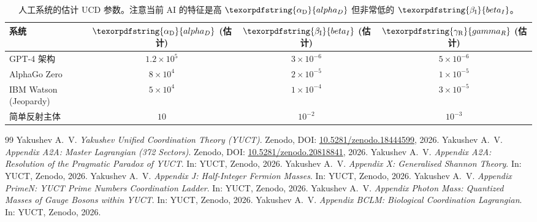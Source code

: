 \documentclass[11pt,a4paper]{article}
\DeclareRobustCommand{\alD}{\texorpdfstring{\ensuremath{\alpha_{\mathrm{D}}}}{alpha_D}}
\DeclareRobustCommand{\beI}{\texorpdfstring{\ensuremath{\beta_{\mathrm{I}}}}{beta_I}}
\DeclareRobustCommand{\gaR}{\texorpdfstring{\ensuremath{\gamma_{\mathrm{R}}}}{gamma_R}}
\begin{document}
	\begin{table}[ht]
		\centering
		\begin{tabular}{lccc}
			\toprule
			\textbf{系统} & \(\alD\) (估计) & \(\beI\) (估计) & \(\gaR\) (估计) \\
			\midrule
			GPT-4 架构 & \(1.2 \times 10^5\) & \(3 \times 10^{-6}\) & \(5 \times 10^{-6}\) \\
			AlphaGo Zero & \(8 \times 10^4\) & \(2 \times 10^{-5}\) & \(1 \times 10^{-5}\) \\
			IBM Watson (Jeopardy) & \(5 \times 10^4\) & \(1 \times 10^{-4}\) & \(3 \times 10^{-5}\) \\
			简单反射主体 & \(10\) & \(10^{-2}\) & \(10^{-3}\) \\
			\bottomrule
		\end{tabular}
		\caption{人工系统的估计 UCD 参数。注意当前 AI 的特征是高 \(\alD\) 但非常低的 \(\beI\)。}
		\label{tab:ai-measurements}
	\end{table}
	
	\begin{thebibliography}{99}
		Yakushev A.~V. \emph{Yakushev Unified Coordination Theory (YUCT)}. Zenodo, DOI: \href{https://doi.org/10.5281/zenodo.18444599}{10.5281/zenodo.18444599}, 2026.
		Yakushev A.~V. \emph{Appendix A2A: Master Lagrangian (372 Sectors)}. Zenodo, DOI: \href{https://doi.org/10.5281/zenodo.20818841}{10.5281/zenodo.20818841}, 2026.
		Yakushev A.~V. \emph{Appendix A2A: Resolution of the Pragmatic Paradox of YUCT}. In: YUCT, Zenodo, 2026.
		Yakushev A.~V. \emph{Appendix X: Generalised Shannon Theory}. In: YUCT, Zenodo, 2026.
		Yakushev A.~V. \emph{Appendix J: Half-Integer Fermion Masses}. In: YUCT, Zenodo, 2026.
		Yakushev A.~V. \emph{Appendix PrimeN: YUCT Prime Numbers Coordination Ladder}. In: YUCT, Zenodo, 2026.
		Yakushev A.~V. \emph{Appendix Photon Mass: Quantized Masses of Gauge Bosons within YUCT}. In: YUCT, Zenodo, 2026.
		Yakushev A.~V. \emph{Appendix BCLM: Biological Coordination Lagrangian}. In: YUCT, Zenodo, 2026.
	\end{thebibliography}
	
\end{document}
